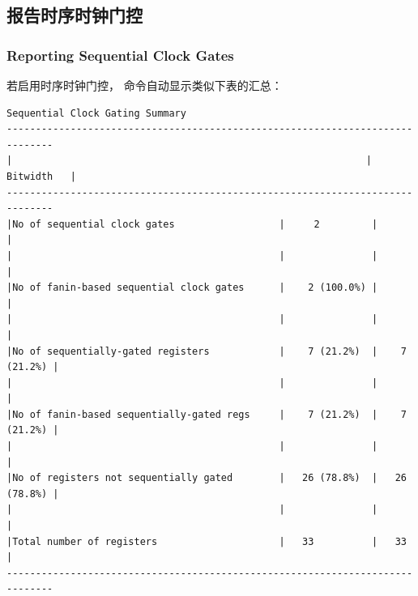 \subsection{报告时序时钟门控}
\subsubsection*{Reporting Sequential Clock Gates}

若启用时序时钟门控， 命令自动显示类似下表的汇总：
\begin{lstlisting}[caption={时序时钟门控汇总示例}]
Sequential Clock Gating Summary
------------------------------------------------------------------------------
|                                                             |   Bitwidth   |
------------------------------------------------------------------------------
|No of sequential clock gates                  |     2         |              |
|                                              |               |              |
|No of fanin-based sequential clock gates      |    2 (100.0%) |              |
|                                              |               |              |
|No of sequentially-gated registers            |    7 (21.2%)  |    7 (21.2%) |
|                                              |               |              |
|No of fanin-based sequentially-gated regs     |    7 (21.2%)  |    7 (21.2%) |
|                                              |               |              |
|No of registers not sequentially gated        |   26 (78.8%)  |   26 (78.8%) |
|                                              |               |              |
|Total number of registers                     |   33          |   33         |
------------------------------------------------------------------------------
\end{lstlisting}

